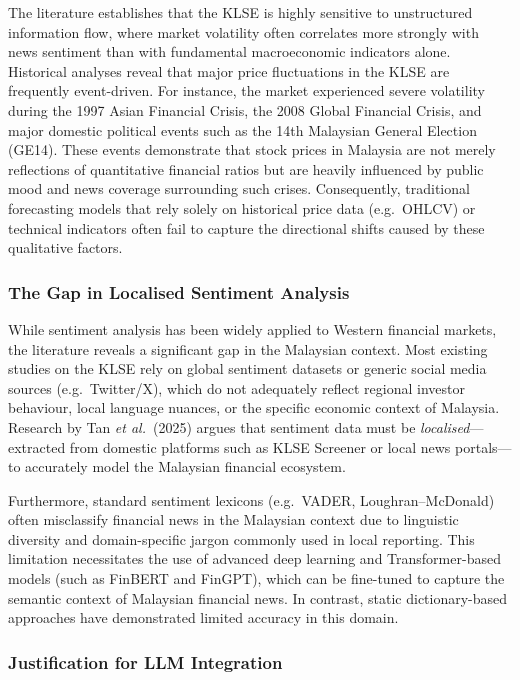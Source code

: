 \documentclass[singlespace]{ucetd}
\begin{document}
The literature establishes that the KLSE is highly sensitive to unstructured information flow, where market volatility often correlates more strongly with news sentiment than with fundamental macroeconomic indicators alone. Historical analyses reveal that major price fluctuations in the KLSE are frequently event-driven. For instance, the market experienced severe volatility during the 1997 Asian Financial Crisis, the 2008 Global Financial Crisis, and major domestic political events such as the 14th Malaysian General Election (GE14). These events demonstrate that stock prices in Malaysia are not merely reflections of quantitative financial ratios but are heavily influenced by public mood and news coverage surrounding such crises. Consequently, traditional forecasting models that rely solely on historical price data (e.g.\ OHLCV) or technical indicators often fail to capture the directional shifts caused by these qualitative factors.

\subsubsection{The Gap in Localised Sentiment Analysis}

While sentiment analysis has been widely applied to Western financial markets, the literature reveals a significant gap in the Malaysian context. Most existing studies on the KLSE rely on global sentiment datasets or generic social media sources (e.g.\ Twitter/X), which do not adequately reflect regional investor behaviour, local language nuances, or the specific economic context of Malaysia. Research by Tan \textit{et al.}\ (2025) argues that sentiment data must be \emph{localised}---extracted from domestic platforms such as KLSE Screener or local news portals---to accurately model the Malaysian financial ecosystem.

Furthermore, standard sentiment lexicons (e.g.\ VADER, Loughran--McDonald) often misclassify financial news in the Malaysian context due to linguistic diversity and domain-specific jargon commonly used in local reporting. This limitation necessitates the use of advanced deep learning and Transformer-based models (such as FinBERT and FinGPT), which can be fine-tuned to capture the semantic context of Malaysian financial news. In contrast, static dictionary-based approaches have demonstrated limited accuracy in this domain.

\subsubsection{Justification for LLM Integration}
\end{document}

